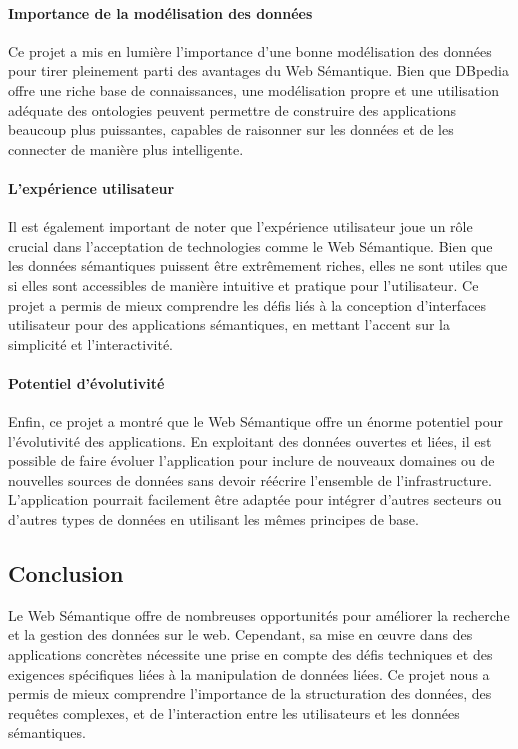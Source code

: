 \documentclass[a4paper]{article}
\begin{document}
\paragraph{Importance de la modélisation des données} Ce projet a mis en lumière l'importance d'une bonne modélisation des données pour tirer pleinement parti des avantages du Web Sémantique. Bien que DBpedia offre une riche base de connaissances, une modélisation propre et une utilisation adéquate des ontologies peuvent permettre de construire des applications beaucoup plus puissantes, capables de raisonner sur les données et de les connecter de manière plus intelligente.

\paragraph{L'expérience utilisateur} Il est également important de noter que l'expérience utilisateur joue un rôle crucial dans l'acceptation de technologies comme le Web Sémantique. Bien que les données sémantiques puissent être extrêmement riches, elles ne sont utiles que si elles sont accessibles de manière intuitive et pratique pour l'utilisateur. Ce projet a permis de mieux comprendre les défis liés à la conception d'interfaces utilisateur pour des applications sémantiques, en mettant l'accent sur la simplicité et l'interactivité.

\paragraph{Potentiel d'évolutivité} Enfin, ce projet a montré que le Web Sémantique offre un énorme potentiel pour l'évolutivité des applications. En exploitant des données ouvertes et liées, il est possible de faire évoluer l'application pour inclure de nouveaux domaines ou de nouvelles sources de données sans devoir réécrire l'ensemble de l'infrastructure. L'application pourrait facilement être adaptée pour intégrer d'autres secteurs ou d'autres types de données en utilisant les mêmes principes de base.

\subsection{Conclusion} Le Web Sémantique offre de nombreuses opportunités pour améliorer la recherche et la gestion des données sur le web. Cependant, sa mise en œuvre dans des applications concrètes nécessite une prise en compte des défis techniques et des exigences spécifiques liées à la manipulation de données liées. Ce projet nous a permis de mieux comprendre l'importance de la structuration des données, des requêtes complexes, et de l'interaction entre les utilisateurs et les données sémantiques.
\end{document}

